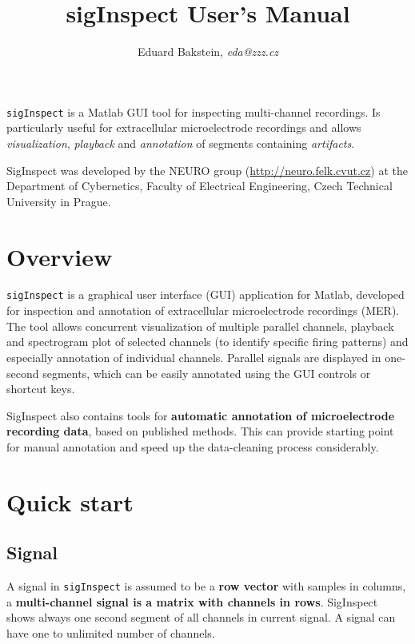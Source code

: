 \documentclass[a4paper,10pt]{article}
\title{sigInspect User's Manual}
\author{Eduard Bakstein, \emph{eda@zzz.cz}}
\begin{document}
\maketitle

\begin{center}
\begin{minipage}{.75\linewidth}

\verb|sigInspect| is a Matlab GUI tool for inspecting multi-channel recordings. Is particularly useful for extracellular microelectrode recordings and allows \emph{visualization}, \emph{playback} and \emph{annotation} of segments containing \emph{artifacts}.

SigInspect was developed by the NEURO group (\url{http://neuro.felk.cvut.cz}) at the Department of Cybernetics, Faculty of Electrical Engineering, Czech Technical University in Prague.
	
\end{minipage}
\end{center}

\tableofcontents
\vspace{1.5em}
\section{Overview}
\verb|sigInspect| is a graphical user interface (GUI) application for Matlab, developed for inspection and annotation of extracellular microelectrode recordings (MER). The tool allows concurrent visualization of multiple parallel channels, playback and spectrogram plot of selected channels (to identify specific firing patterns) and especially annotation of individual channels. Parallel signals are displayed in one-second segments, which can be easily annotated using the GUI controls or shortcut keys.

SigInspect also contains tools for \textbf{automatic annotation of microelectrode recording data}, based on published methods. This can provide starting point for manual annotation and speed up the data-cleaning process considerably.

\newpage

\section{Quick start}

\subsection{Signal}
A signal in \verb|sigInspect| is assumed to be a \textbf{row vector} with samples in columns, a \textbf{multi-channel signal is a matrix with channels in rows}. SigInspect shows always one second segment of all channels in current signal. A signal can have one to unlimited number of channels.
\end{document}
